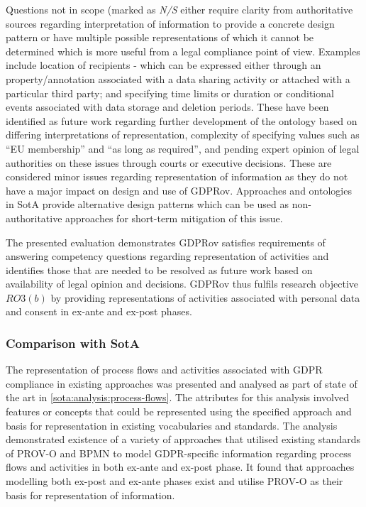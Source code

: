 Questions not in scope (marked as \textit{N/S} either require clarity from authoritative sources regarding interpretation of information to provide a concrete design pattern or have multiple possible representations of which it cannot be determined which is more useful from a legal compliance point of view. Examples include location of recipients - which can be expressed either through an property/annotation associated with a data sharing activity or attached with a particular third party; and specifying time limits or duration or conditional events associated with data storage and deletion periods. These have been identified as future work regarding further development of the ontology based on differing interpretations of representation, complexity of specifying values such as ``EU membership'' and  ``as long as required'', and pending expert opinion of legal authorities on these issues through courts or executive decisions.
These are considered minor issues regarding representation of information as they do not have a major impact on design and use of GDPRov.
Approaches and ontologies in SotA provide alternative design patterns which can be used as non-authoritative approaches for short-term mitigation of this issue.

The presented evaluation demonstrates GDPRov satisfies requirements of answering competency questions regarding representation of activities and identifies those that are needed to be resolved as future work based on availability of legal opinion and decisions. GDPRov thus fulfils research objective $RO3(b)$ by providing representations of activities associated with personal data and consent in ex-ante and ex-post phases.

\subsubsection{Comparison with SotA}
The representation of process flows and activities associated with GDPR compliance in existing approaches was presented and analysed as part of state of the art in \autoref{sota:analysis:process-flows}.
The attributes for this analysis involved features or concepts that could be represented using the specified approach and basis for representation in existing vocabularies and standards.
The analysis demonstrated existence of a variety of approaches that utilised  existing standards of PROV-O and BPMN to model GDPR-specific information regarding process flows and activities in both ex-ante and ex-post phase. It found that approaches modelling both ex-post and ex-ante phases exist and utilise PROV-O as their basis for representation of information.

